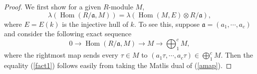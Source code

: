 \documentclass[draft]{amsart}
\theoremstyle{definition}
\numberwithin{equation}{theorem}
\begin{document}
\begin{proof}
We first show for a given $R$-module $M$, 
\begin{equation}\label{fact1}
{\lambda} ({\mathop{\mathrm{Hom}}\nolimits} (R/ {\mathfrak{a}}, M)) = {\lambda}( {\mathop{\mathrm{Hom}}\nolimits}(M,E) \otimes R/ {\mathfrak{a}}),
\end{equation}
where $E=E(k)$ is the injective hull of $k$.
To see this, suppose ${\mathfrak{a}}=(a_1, \cdots, a_c)$ and consider the following exact sequence
\begin{equation}\label{amap}
0 \to {\mathop{\mathrm{Hom}}\nolimits} (R/ {\mathfrak{a}}, M) \to M \to \bigoplus_1^c M,
\end{equation}
where the rightmost map sends every $\tau \in M$ to $(a_1\tau, \cdots, a_c \tau) \in \bigoplus_1^c M$.
Then the equality (\ref{fact1}) follows easily from taking the Matlis dual of (\ref{amap}).


\end{proof}
\end{document}
